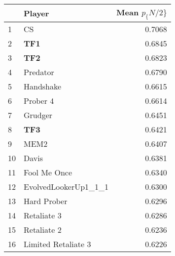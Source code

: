 \begin{tabular}{llr}
\toprule
{} &                Player &  Mean $p_\{N/2\}$ \\
\midrule
1  &                    CS &          0.7068 \\
2  &                   \textbf{TF1} &          0.6845 \\
3  &                   \textbf{TF2} &          0.6823 \\
4  &              Predator &          0.6790 \\
5  &             Handshake &          0.6615 \\
6  &              Prober 4 &          0.6614 \\
7  &               Grudger &          0.6451 \\
8  &                   \textbf{TF3} &          0.6421 \\
9  &                  MEM2 &          0.6407 \\
10 &                 Davis &          0.6381 \\
11 &          Fool Me Once &          0.6340 \\
12 &  EvolvedLookerUp1\_1\_1 &          0.6300 \\
13 &           Hard Prober &          0.6296 \\
14 &           Retaliate 3 &          0.6286 \\
15 &           Retaliate 2 &          0.6236 \\
16 &   Limited Retaliate 3 &          0.6226 \\
\bottomrule
\end{tabular}
